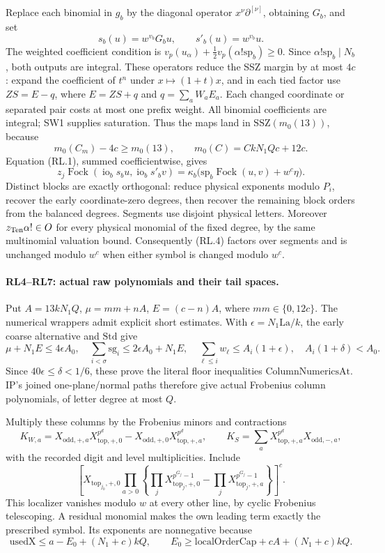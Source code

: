 \documentclass[11pt,a4paper]{article}
\numberwithin{equation}{section}
\theoremstyle{remark}\newtheorem{remark}[theorem]{Remark}
\begin{document}
Replace each binomial in \(g_b\) by the diagonal operator
\(x^\nu\partial^{[\nu]}\), obtaining \(G_b\), and set
\[
 s_b(u)=w^{v_b}G_bu,\qquad s'_b(u)=w^{v_b}u.       \tag{RL.3}
\]
The weighted coefficient condition is
\(v_p(u_\alpha)+\tfrac12v_p(\alpha!\mathrm{sp}_b)\ge0\).
Since \(\alpha!\mathrm{sp}_b\mid N_b\), both outputs are integral.
These operators reduce the SSZ margin by at most \(4c\): expand the
coefficient of \(t^n\) under \(x\mapsto(1+t)x\), and in each tied factor
use \(ZS=E-q\), where \(E=ZS+q\) and \(q=\sum_aW_aE_a\).
Each changed coordinate or separated pair costs at most one prefix
weight. All binomial coefficients are integral; SW1 supplies saturation.
Thus the maps land in \(\mathrm{SSZ}(m_0(13))\), because
\[
 m_0(C_m)-4c\ge m_0(13),\qquad
 m_0(C)=CkN_1Qc+12c .
\]
Equation (RL.1), summed coefficientwise, gives
\[
 z_j\operatorname{Fock}(\operatorname{io}_bs_bu,
                        \operatorname{io}_bs'_bv)
 =\kappa_b\bigl(\mathrm{sp}_b\operatorname{Fock}(u,v)+w^c\eta\bigr).
 \tag{RL.4}
\]
Distinct blocks are exactly orthogonal: reduce physical exponents modulo
\(P_i\), recover the early coordinate-zero degrees, then recover the
remaining block orders from the balanced degrees. Segments use disjoint
physical letters. Moreover \(z_{\rm Ten}\alpha!\in O\) for every physical
monomial of the fixed degree, by the same multinomial valuation bound.
Consequently (RL.4) factors over segments and is unchanged modulo \(w^c\)
when either symbol is changed modulo \(w^c\).

\paragraph{RL4--RL7: actual raw polynomials and their tail spaces.}
Put \(A=13kN_1Q\), \(\mu=mm+nA\), \(E=(c-n)A\), where
\(mm\in\{0,12c\}\). The numerical wrappers admit explicit short estimates.
With \(\epsilon=N_1\mathrm{La}/k\), the early coarse alternative and
\(\mathrm{Std}\) give
\[
 \mu+N_1E\le4\epsilon A_0,\quad
 \sum_{i<\sigma}\mathrm{sg}_i\le2\epsilon A_0+N_1E,\quad
 \sum_{\ell\le i}w_\ell\le A_i(1+\epsilon),\quad
 A_i(1+\delta)<A_0 .
\]
Since \(40\epsilon\le\delta<1/6\), these prove the literal
floor inequalities \(\mathrm{ColumnNumericsAt}\).
IP's joined one-plane/normal paths therefore give actual Frobenius
column polynomials, of letter degree at most \(Q\).

Multiply these columns by the Frobenius minors and contractions
\[
 K_{W,a}=X_{\mathrm{odd},+,a}X_{\mathrm{top},+,0}^{p^d}
          -X_{\mathrm{odd},+,0}X_{\mathrm{top},+,a}^{p^d},
 \qquad K_S=\sum_aX_{\mathrm{top},+,a}^{p^d}X_{\mathrm{odd},-,a},
\]
with the recorded digit and level multiplicities. Include
\[
 \left[X_{\mathrm{top}_{j_0},+,0}
 \prod_{a>0}\left\{\prod_jX_{\mathrm{top}_j,+,0}^{p^{G_j}-1}
                    -\prod_jX_{\mathrm{top}_j,+,a}^{p^{G_j}-1}
             \right\}\right]^c.                         \tag{RL.5}
\]
This localizer vanishes modulo \(w\) at every other line, by cyclic
Frobenius telescoping. A residual monomial makes the own leading term
exactly the prescribed symbol. Its exponents are nonnegative because
\[
 \mathrm{usedX}\le a-E_0+(N_1+c)kQ,\qquad
 E_0\ge\mathrm{localOrderCap}+cA+(N_1+c)kQ .
\]
\end{document}
